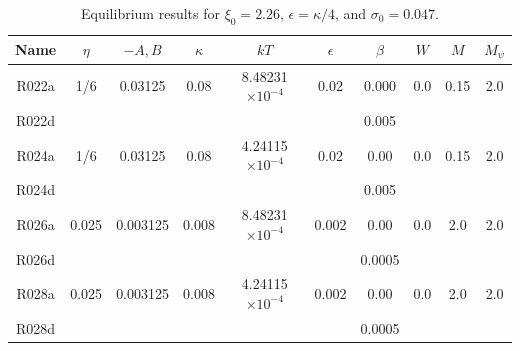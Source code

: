 \begin{table}[h]
\begin{center}
\begin{tabular}{|c|c|c|c|c|c|c|c|c|c|}
\hline
Name & $\eta$ & $-A,B$ & $\kappa$ & $kT$ & $\epsilon$ & $\beta$ & $W$
     & $M$ & $M_\psi$\\
\hline
R022a & 1/6 & 0.03125 & 0.08 & 8.48231$\times 10^{-4}$ & 0.02 & 0.000 & 0.0 
      & 0.15 & 2.0 \\
R022d &  &  &  & & & 0.005 &  &  &  \\
\hline
R024a & 1/6 & 0.03125 & 0.08 & 4.24115$\times 10^{-4}$ & 0.02 & 0.00 & 0.0 
      & 0.15 & 2.0 \\
R024d & &  &  &  & & 0.005 &  &  &  \\
\hline
R026a & 0.025 & 0.003125 & 0.008 & 8.48231$\times 10^{-4}$ & 0.002 & 0.00
      & 0.0 & 2.0 & 2.0 \\
R026d & &  &  &  & & 0.0005 &  &  &  \\
\hline
R028a & 0.025 & 0.003125 & 0.008 & 4.24115$\times 10^{-4}$ & 0.002 & 0.00
      & 0.0 & 2.0 & 2.0 \\
R028d & &  &  &  & & 0.0005 &  &  &  \\
\hline
\end{tabular}
\caption{Equilibrium results for $\xi_0 = 2.26$, $\epsilon = \kappa/4$, and
$\sigma_0 = 0.047$.}
\end{center}
\end{table}





